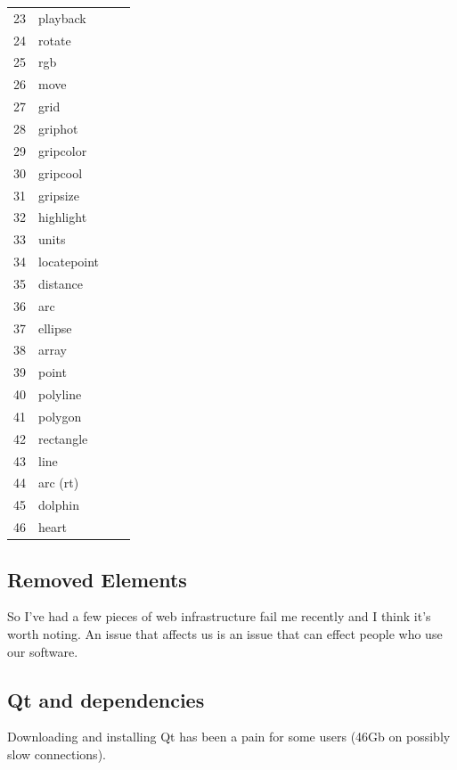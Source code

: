\documentclass{report}
\begin{document}
\begin{longtable}{l l l p{8cm}}
23 & \index{playback}playback & & \\
24 & \index{rotate}rotate & & \\
25 & \index{rgb}rgb & & \\
26 & \index{move}move & & \\
27 & \index{grid}grid & & \\
28 & \index{griphot}griphot &  &  \\
29 & \index{gripcolor}gripcolor & & \\
30 & \index{gripcool}gripcool &  &  \\
31 & \index{gripsize}gripsize &  &  \\
32 & \index{highlight}highlight &  &  \\
33 & \index{units}units &  &  \\
34 & \index{locatepoint}locatepoint &  &  \\
35 & \index{distance}distance &  &  \\
36 & \index{arc}arc &  &  \\
37 & \index{ellipse}ellipse &  &  \\
38 & \index{array}array &  &  \\
39 & \index{point}point &  &  \\
40 & \index{polyline}polyline &  &  \\
41 & \index{polygon}polygon &  &  \\
42 & \index{rectangle}rectangle &  &  \\
43 & \index{line}line &  &  \\
44 & \index{arc-rt}arc (rt) &  &  \\
45 & \index{dolphin}dolphin &  &  \\
46 & \index{heart}heart  & &
\end{longtable}

\subsection{Removed Elements}

So I've had a few pieces of web infrastructure fail me recently and
I think it's worth noting. An issue that affects us is an issue that
can effect people who use our software.

\subsection{Qt and dependencies}

Downloading and installing Qt has been a pain for some users
(46Gb on possibly slow connections).
\end{document}
